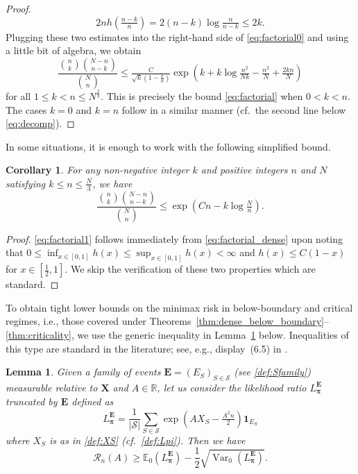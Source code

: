 \documentclass[11pt,reqno,letterpaper]{amsart}
\numberwithin{equation}{section}
\theoremstyle{plain}
\newtheorem{lemma}[theorem]{Lemma}
\newtheorem{corollary}[theorem]{Corollary}
\def \bpi{\boldsymbol{\pi}}
\def \bX{\mathbf{X}}
\def \E{\mathbb{E}}
\def \R{\mathbb{R}}
\providecommand{\var}{\operatorname{Var}}
\providecommand{\bE}{\mathbf E}
\begin{document}
\begin{proof}
\begin{equation*}
 2nh(\tfrac{n-k}{n}) = 2(n - k)\log \tfrac{n}{n - k} \le 2k. 
\end{equation*}
Plugging these two estimates into the right-hand side of \eqref{eq:factorial0} and 
using a little bit of algebra, we obtain
\begin{equation*}
 \frac{\binom{n}{k}\binom{N - n}{n - k}}{\binom{N}{n}} \le \tfrac{C}{\sqrt{k}(1 - \frac k n)}\exp(k + k\log \tfrac {n^2}{Nk} -\tfrac{n^2}N + \tfrac{2kn}N)
\end{equation*}
for all %
$1 \le k < n \le N^{\frac 23}$. This is precisely the bound \eqref{eq:factorial} 
when $0 < k < n$. The cases $k = 0$ and $k = n$ follow in a similar manner 
(cf.~the second line below \eqref{eq:decomp}).
\end{proof}
In some situations, it is enough to work with the following simplified bound.
\begin{corollary}\label{cor:factorial} 
For any non-negative integer $k$ and positive integers $n$ and $N$ satisfying $k 
\le n \le \tfrac N 3$, we have
\begin{equation}\label{eq:factorial1}
\frac{\binom{n}{k}\binom{N - n}{n - k}}{\binom{N}{n}} \le \exp(C n - k\log \tfrac{N}{n}).\end{equation}
\end{corollary}
\begin{proof}
\eqref{eq:factorial1} follows immediately from \eqref{eq:factorial_dense} upon 
noting that $0 \le \inf_{x \in [0, 1]} h(x) \le \sup_{x \in [0, 1]} h(x) < \infty$ 
and $h(x) \le C(1 - x)$ for $x \in [\frac 12, 1]$. We skip the verification of 
these two properties which are standard.
\end{proof}
To obtain tight lower bounds on the minimax risk in below-boundary and critical 
regimes, i.e., those covered under Theorems~\ref{thm:dense_below_boundary}--\ref{thm:criticality}, we use the generic inequality in 
Lemma~\ref{lem:risk_lowerbnd_ab} below. Inequalities of this type are standard in 
the literature; see, e.g., display~(6.5) in \cite{mukherjee2020minimax}.
\begin{lemma}\label{lem:risk_lowerbnd_ab}
Given a family of events $\bE = (E_S)_{S \in \mathcal S}$ (see \eqref{def:Sfamily}) measurable relative to $\bX$ and $A \in \R$, let us 
consider the likelihood ratio $L_{\bpi}^{\bE}$ truncated by $\bE$ defined as
\begin{equation}\label{def:LpiE}
L_{\bpi}^{\bE} = \frac{1}{|\mathcal S|} \sum_{S \in \mathcal S} \exp\left(A X_S - \tfrac{A^2n}{2}\right)\mathbf 1_{E_S}
\end{equation}
where $X_S$ is as in \eqref{def:XS} (cf.~\eqref{def:Lpi}). Then we have
\begin{equation}\label{eq:risk_lowerbnd_ab}
\mathcal R_n(A) \ge \E_0(L_{\bpi}^{\bE}) - \frac12\sqrt{\var_0(L_{\bpi}^{\bE})}.%
\end{equation}
\end{lemma}
\end{document}
